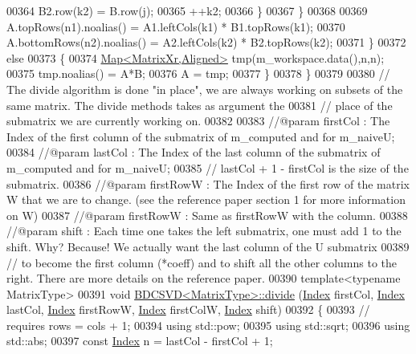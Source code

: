 \begin{DoxyCode}
00364         B2.row(k2) = B.row(j);
00365         ++k2;
00366       \}
00367     \}
00368   
00369     A.topRows(n1).noalias()    = A1.leftCols(k1) * B1.topRows(k1);
00370     A.bottomRows(n2).noalias() = A2.leftCols(k2) * B2.topRows(k2);
00371   \}
00372   \textcolor{keywordflow}{else}
00373   \{
00374     \hyperlink{group___core___module_class_eigen_1_1_map}{Map<MatrixXr,Aligned>} tmp(m\_workspace.data(),n,n);
00375     tmp.noalias() = A*B;
00376     A = tmp;
00377   \}
00378 \}
00379 
00380 \textcolor{comment}{// The divide algorithm is done "in place", we are always working on subsets of the same matrix. The divide
       methods takes as argument the }
00381 \textcolor{comment}{// place of the submatrix we are currently working on.}
00382 
00383 \textcolor{comment}{//@param firstCol : The Index of the first column of the submatrix of m\_computed and for m\_naiveU;}
00384 \textcolor{comment}{//@param lastCol : The Index of the last column of the submatrix of m\_computed and for m\_naiveU; }
00385 \textcolor{comment}{// lastCol + 1 - firstCol is the size of the submatrix.}
00386 \textcolor{comment}{//@param firstRowW : The Index of the first row of the matrix W that we are to change. (see the reference
       paper section 1 for more information on W)}
00387 \textcolor{comment}{//@param firstRowW : Same as firstRowW with the column.}
00388 \textcolor{comment}{//@param shift : Each time one takes the left submatrix, one must add 1 to the shift. Why? Because! We
       actually want the last column of the U submatrix }
00389 \textcolor{comment}{// to become the first column (*coeff) and to shift all the other columns to the right. There are more
       details on the reference paper.}
00390 \textcolor{keyword}{template}<\textcolor{keyword}{typename} MatrixType>
00391 \textcolor{keywordtype}{void} \hyperlink{group___s_v_d___module_class_eigen_1_1_b_d_c_s_v_d}{BDCSVD<MatrixType>::divide} (\hyperlink{namespace_eigen_a62e77e0933482dafde8fe197d9a2cfde}{Index} firstCol, 
      \hyperlink{namespace_eigen_a62e77e0933482dafde8fe197d9a2cfde}{Index} lastCol, \hyperlink{namespace_eigen_a62e77e0933482dafde8fe197d9a2cfde}{Index} firstRowW, \hyperlink{namespace_eigen_a62e77e0933482dafde8fe197d9a2cfde}{Index} firstColW, \hyperlink{namespace_eigen_a62e77e0933482dafde8fe197d9a2cfde}{Index} shift)
00392 \{
00393   \textcolor{comment}{// requires rows = cols + 1;}
00394   \textcolor{keyword}{using} std::pow;
00395   \textcolor{keyword}{using} std::sqrt;
00396   \textcolor{keyword}{using} std::abs;
00397   \textcolor{keyword}{const} \hyperlink{namespace_eigen_a62e77e0933482dafde8fe197d9a2cfde}{Index} n = lastCol - firstCol + 1;

\end{DoxyCode}
